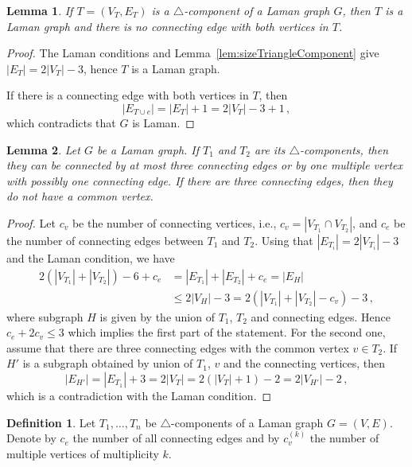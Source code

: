 \documentclass[a4paper, 11pt]{article}
\newcommand{\trcomp}{$\triangle$-component}
\newcommand{\trcomps}{$\triangle$-components}
\newcommand{\cv}[1]{c_v^{(#1)}}
\newtheorem{lem}{Lemma}[section]
\theoremstyle{definition}
\newtheorem{defn}{Definition}[section]
\begin{document}
\begin{lem}
\label{lem:noEdgeInSameComponent}
If $T=(V_T, E_T)$ is a \trcomp{} of  a Laman graph $G$, then $T$ is a Laman graph and there is no connecting edge with both vertices in $T$.
\end{lem}
\begin{proof}
The Laman conditions and Lemma~\ref{lem:sizeTriangleComponent} give $|E_T|= 2|V_T|-3$, hence $T$ is a Laman graph.

If there is a connecting edge with both vertices in $T$, then
$$
|E_{T\cup e}|=|E_T| +1 =2|V_T| -3+1\,,
$$
which contradicts that $G$ is Laman.
\end{proof}

\begin{lem}
\label{lem:threeEdgesOrVertexAndEdge}
Let $G$ be a Laman graph. If $T_1$ and $T_2$ are its \trcomps{}, then they can be connected by at most three connecting edges or by one multiple vertex with possibly one connecting edge. If there are three connecting edges, then they do not have a common vertex.
\end{lem}
\begin{proof}
Let $c_v$ be the number of connecting vertices, i.e., $c_v=|V_{T_1}\cap V_{T_2}|$, and $c_e$ be the number of connecting edges between $T_1$ and $T_2$. Using that $|E_{T_i}|= 2|V_{T_i}|-3$ and the Laman condition, we have
\begin{align*}
2(|V_{T_1}|+|V_{T_2}|)-6 +c_e&=|E_{T_1}|+|E_{T_2}|+c_e=|E_{H}| \\
&\leq 2|V_H| -3=2(|V_{T_1}|+|V_{T_2}|-c_v)-3\,,
\end{align*}
where subgraph $H$ is given by the union of $T_1$, $T_2$ and connecting edges. Hence $c_e+2c_v \leq 3$ which implies the first part of the statement. For the second one, assume that there are three connecting edges with the common vertex  $v\in T_2$. If $H'$ is a subgraph obtained by union of $T_1$, $v$ and the connecting vertices, then
$$
|E_{H'}|=|E_{T_1}|+3=2|V_T|=2(|V_T|+1)-2=2|V_{H'}|-2\,,
$$
which is a contradiction with the Laman condition.
\end{proof}

\begin{defn}
Let $T_1, \dots, T_n$ be \trcomps{} of a Laman graph $G=(V,E)$. Denote by $c_e$ the number of all connecting edges and by $\cv{k}$ the number of multiple vertices of multiplicity $k$.
\end{defn}
\end{document}

